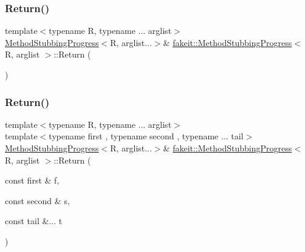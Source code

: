 \mbox{\label{structfakeit_1_1MethodStubbingProgress_a4743b7e25e98cd6a2be2c03b7a9416d4}} 
\subsubsection{\texorpdfstring{Return()}{Return()}\hspace{0.1cm}{\footnotesize\ttfamily [30/45]}}
{\footnotesize\ttfamily template$<$typename R, typename ... arglist$>$ \\
\mbox{\hyperlink{structfakeit_1_1MethodStubbingProgress}{Method\+Stubbing\+Progress}}$<$R, arglist...$>$\& \mbox{\hyperlink{structfakeit_1_1MethodStubbingProgress}{fakeit\+::\+Method\+Stubbing\+Progress}}$<$ R, arglist $>$\+::Return (\begin{DoxyParamCaption}{ }\end{DoxyParamCaption})\hspace{0.3cm}{\ttfamily [inline]}}

\mbox{\label{structfakeit_1_1MethodStubbingProgress_ae8417ec5f29f70be1ae914755b05e4db}} 
\subsubsection{\texorpdfstring{Return()}{Return()}\hspace{0.1cm}{\footnotesize\ttfamily [31/45]}}
{\footnotesize\ttfamily template$<$typename R, typename ... arglist$>$ \\
template$<$typename first , typename second , typename ... tail$>$ \\
\mbox{\hyperlink{structfakeit_1_1MethodStubbingProgress}{Method\+Stubbing\+Progress}}$<$R, arglist...$>$\& \mbox{\hyperlink{structfakeit_1_1MethodStubbingProgress}{fakeit\+::\+Method\+Stubbing\+Progress}}$<$ R, arglist $>$\+::Return (\begin{DoxyParamCaption}\item[{const first \&}]{f,  }\item[{const second \&}]{s,  }\item[{const tail \&...}]{t }\end{DoxyParamCaption})\hspace{0.3cm}{\ttfamily [inline]}}

